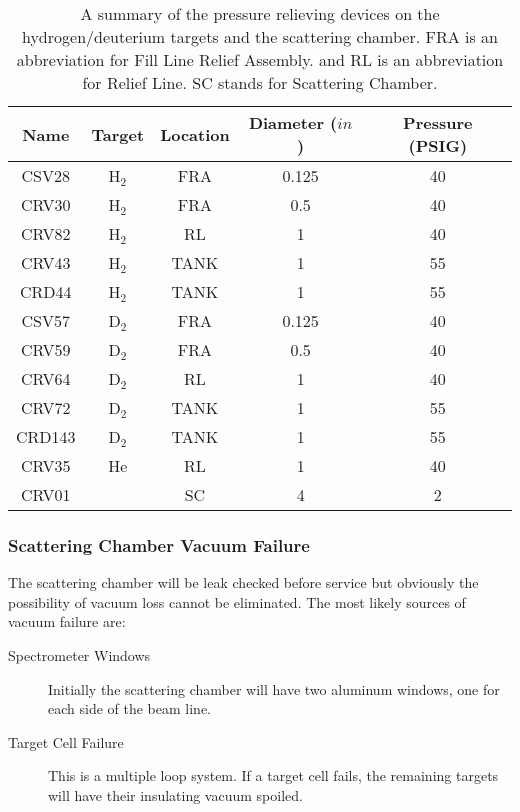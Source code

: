 {\begin{safetyen}{10}{5}
\begin{table}[htb]
\begin{center}
\begin{tabular}{|c|c|c|c|c|} \hline
Name & Target & Location & Diameter ($in$) & Pressure (PSIG) \\ \hline
CSV28 & H$_2$ & FRA & 0.125 & 40 \\ \hline
CRV30 & H$_2$ & FRA & 0.5 & 40 \\ \hline
CRV82 & H$_2$ & RL &  1 & 40 \\ \hline
CRV43 & H$_2$ & TANK & 1 & 55 \\ \hline
CRD44 & H$_2$ & TANK & 1 & 55 \\ \hline
CSV57 & D$_2$ & FRA & 0.125 & 40 \\ \hline
CRV59 & D$_2$ & FRA & 0.5 & 40 \\ \hline
CRV64 & D$_2$ & RL &  1 & 40 \\ \hline
CRV72 & D$_2$ & TANK & 1 & 55 \\ \hline
CRD143 & D$_2$ & TANK & 1 & 55 \\ \hline
CRV35 & He & RL &  1 & 40 \\ \hline
CRV01 &  & SC & 4 & 2 \\ \hline
\end{tabular}
\end{center}
\caption[Cryotarget: Relief Device Summary]{ A summary of the pressure relieving devices on the
hydrogen/deuterium targets and the scattering chamber. FRA
is an abbreviation for Fill Line Relief Assembly. 
and RL is an abbreviation for
Relief Line. SC stands for Scattering Chamber.}
\label{ta:pre}
\end{table}

\subsubsection{ Scattering Chamber Vacuum Failure}
\label{sec:cryo_targ_cmb_falure}

The scattering chamber will be leak checked before service but obviously
the possibility of vacuum loss cannot be eliminated. The most
likely sources of vacuum failure are:

\begin{description}
\item[Spectrometer Windows] Initially the scattering chamber will have two
 aluminum windows, one for each side of the beam line.
\item[Target Cell Failure] This is a multiple loop system. If a target
cell fails, the remaining targets will have their insulating
vacuum spoiled.
\end{description}


\end{safetyen}}
